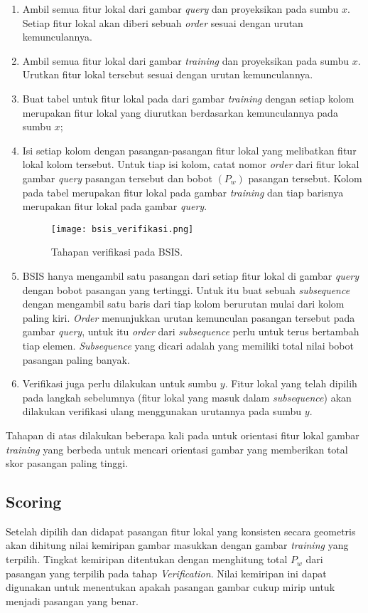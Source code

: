 \begin{enumerate}
	\item Ambil semua fitur lokal dari gambar \textit{query} dan proyeksikan pada sumbu $x$. Setiap fitur lokal akan diberi sebuah \textit{order} sesuai dengan urutan kemunculannya.
	\item Ambil semua fitur lokal dari gambar \textit{training} dan proyeksikan pada sumbu $x$. Urutkan fitur lokal tersebut sesuai dengan urutan kemunculannya.
	\item Buat tabel untuk fitur lokal pada dari gambar \textit{training} dengan setiap kolom merupakan fitur lokal yang diurutkan berdasarkan kemunculannya pada sumbu $x$;   
	\item Isi setiap kolom dengan pasangan-pasangan fitur lokal yang melibatkan fitur lokal kolom tersebut. Untuk tiap isi kolom, catat nomor \textit{order} dari fitur lokal gambar \textit{query} pasangan tersebut dan bobot $(P_w)$ pasangan tersebut. Kolom pada tabel merupakan fitur lokal pada gambar \textit{training} dan tiap barisnya merupakan fitur lokal pada gambar \textit{query}.
	\begin{figure}[H]
		\centering
		\texttt{[image: bsis\_verifikasi.png]}
		\label{fig:bsis_verifikasi}
		\caption{Tahapan verifikasi pada BSIS.}
	\end{figure}
	\item BSIS hanya mengambil satu pasangan dari setiap fitur lokal di gambar \textit{query} dengan bobot pasangan yang tertinggi. Untuk itu buat sebuah \textit{subsequence} dengan mengambil satu baris dari tiap kolom berurutan mulai dari kolom paling kiri. \textit{Order} menunjukkan urutan kemunculan pasangan tersebut pada gambar \textit{query}, untuk itu \textit{order} dari \textit{subsequence} perlu untuk terus bertambah tiap elemen. \textit{Subsequence} yang dicari adalah yang memiliki total nilai bobot pasangan paling banyak.
	\item Verifikasi juga perlu dilakukan untuk sumbu $y$. Fitur lokal yang telah dipilih pada langkah sebelumnya (fitur lokal yang masuk dalam \textit{subsequence}) akan dilakukan verifikasi ulang menggunakan urutannya pada sumbu $y$.
\end{enumerate}
Tahapan di atas dilakukan beberapa kali pada untuk orientasi fitur lokal gambar \textit{training} yang berbeda untuk mencari orientasi gambar yang memberikan total skor pasangan paling tinggi.

\subsection{Scoring}
\label{subsec:bsis_scoring}
Setelah dipilih dan didapat pasangan fitur lokal yang konsisten secara geometris akan dihitung nilai kemiripan gambar masukkan dengan gambar \textit{training} yang terpilih. Tingkat kemiripan ditentukan dengan menghitung total $P_w$ dari pasangan yang terpilih pada tahap \textit{Verification}. Nilai kemiripan ini dapat digunakan untuk menentukan apakah pasangan gambar cukup mirip untuk menjadi pasangan yang benar.

